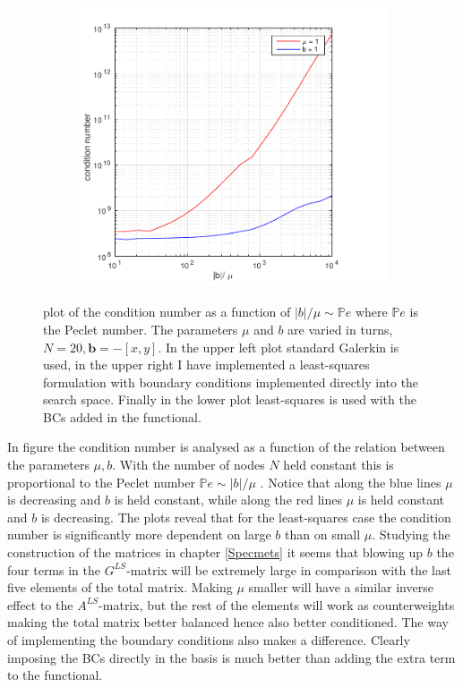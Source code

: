 \begin{figure}[h!]
\begin{subfigure}[b]{0.48\textwidth}
  \end{subfigure}
  \begin{subfigure}[b]{0.48\textwidth}
		\includegraphics[width=\textwidth]{Figures/Spec-LS_difftrans_ConditionNumber_DirFunc.pdf}
  \end{subfigure}
  \vspace{-0.1\baselineskip}
	\caption{plot of the condition number as a function of $|b|/\mu \sim \mathbb{P}e$ where $\mathbb{P}e$ is the Peclet number. The parameters $\mu$ and $b$ are varied in turns, $N=20,\mathbf{b} = -[x,y]$. In the upper left plot standard Galerkin is used, in the upper right I have implemented a least-squares formulation with boundary conditions implemented directly into the search space. Finally in the lower plot least-squares is used with the BCs added in the functional.}
  \label{fig:CondDifftransSpec}
\end{figure}
%
In figure the condition number is analysed as a function of the relation between the parameters $\mu,b$. With the number of nodes $N$ held constant this is proportional to the Peclet number $\mathbb{P}e \sim |b|/\mu$ \cite{Quarteroni}. Notice that along the blue lines $\mu$ is decreasing and $b$ is held constant, while along the red lines $\mu$ is held constant and $b$ is decreasing. The plots reveal that for the least-squares case the condition number is significantly more dependent on large $b$ than on small $\mu$. Studying the construction of the matrices in chapter \ref{Specmets} it seems that blowing up $b$ the four terms in the $G^{LS}$-matrix will be extremely large in comparison with the last five elements of the total matrix. Making $\mu$ smaller will have a similar inverse effect to the $A^{LS}$-matrix, but the rest of the elements will work as counterweights making the total matrix better balanced hence also better conditioned. The way of implementing the boundary conditions also makes a difference. Clearly imposing the BCs directly in the basis is much better than adding the extra term to the functional.    

